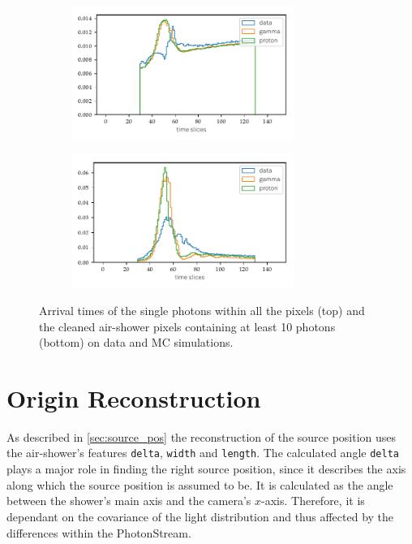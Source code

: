 \begin{figure}
  \begin{subfigure}{\textwidth}
    \centering
    \includegraphics[width=0.8\textwidth]{Plots/all_slices_min_0_per_pixel.pdf}
  \end{subfigure}
  \begin{subfigure}{\textwidth}
    \centering
    \includegraphics[width=0.8\textwidth]{Plots/all_slices_min_10_per_pixel.pdf}
  \end{subfigure}
  \caption{Arrival times of the single photons within all the pixels (top) and the cleaned air-shower pixels containing at least 10 photons (bottom) on data and MC simulations.}
  \label{fig:slices}
\end{figure}

\section{Origin Reconstruction}
%
As described in \autoref{sec:source_pos} the reconstruction of the source
position uses the air-shower's features \texttt{delta}, \texttt{width} and
\texttt{length}. The calculated angle \texttt{delta} plays a major role in
finding the right source position, since it describes the axis along which
the source position is assumed to be. It is calculated as the angle between
the shower's main axis and the camera's $x$-axis. Therefore, it is dependant
on the covariance of the light distribution and thus affected by the
differences within the PhotonStream.

